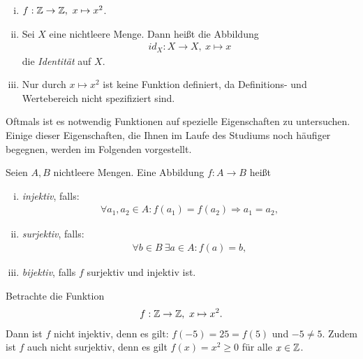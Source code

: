 \begin{example}
    \begin{enumerate}[(i)]
        \item
        $f: \mathbb{Z} \to \mathbb{Z}, \ x \mapsto x^2 $. 
        \item 
        Sei $X$ eine nichtleere Menge. Dann heißt die Abbildung 
        \begin{align*}
            id_X : X \to X, \ x \mapsto x
        \end{align*}
        die \textit{Identität} auf $X$. 
        \item 
        Nur durch $x \mapsto x^2$ ist keine Funktion definiert, da Definitions- und Wertebereich nicht spezifiziert sind. 
    \end{enumerate}
\end{example}

Oftmals ist es notwendig Funktionen auf spezielle Eigenschaften zu untersuchen. Einige dieser Eigenschaften,
die Ihnen im Laufe des Studiums noch häufiger begegnen, werden im Folgenden vorgestellt. 

\begin{mydef}
    Seien $A,B$ nichtleere Mengen. Eine Abbildung $f:A \to B$ heißt
    \begin{enumerate}[(i)]
        \item
        \textit{injektiv}, falls: 
        \begin{align*}
            \forall a_1,a_2 \in A: f(a_1)=f(a_2) \Rightarrow a_1 = a_2, 
        \end{align*}
        \item 
        \textit{surjektiv}, falls: 
        \begin{align*}
            \forall b \in B \ \exists a \in A: f(a) = b,
        \end{align*}
        \item 
        \textit{bijektiv}, falls $f$ surjektiv und injektiv ist. 
    \end{enumerate}
\end{mydef}

\begin{example}
    Betrachte die Funktion 
    \begin{align*}
        f: \mathbb{Z} \to \mathbb{Z}, \ x \mapsto x^2.
    \end{align*}
    Dann ist $f$ nicht injektiv, denn es gilt: $f(-5) = 25 = f(5)$ und $-5 \neq 5$. Zudem ist $f$ auch nicht surjektiv, denn es gilt $f(x) = x^2 \geq 0$ für alle $x \in \mathbb{Z}$. 
\end{example}


